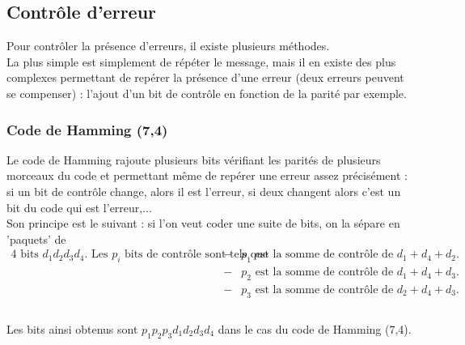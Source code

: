 \documentclass[a4paper,10pt]{book}
\begin{document}
\subsection{Contrôle d'erreur}
Pour contrôler la présence d'erreurs, il existe plusieurs méthodes.\\

La plus simple est simplement de répéter le message, mais il en existe des plus complexes permettant de repérer la présence d'une erreur (deux erreurs peuvent se compenser) : l'ajout d'un bit de contrôle en fonction de la parité par exemple.\\

\subsubsection{Code de Hamming (7,4)}
Le code de Hamming rajoute plusieurs bits vérifiant les parités de plusieurs morceaux du code et permettant même de repérer une erreur assez précisément : si un bit de contrôle change, alors il est l'erreur, si deux changent alors c'est un bit du code qui est l'erreur,...\\

Son principe est le suivant : si l'on veut coder une suite de bits, on la sépare en 'paquets' de
$\begin{array}{rcl}\text{4 bits }d_{1}d_{2}d_{3}d_{4}. \text{ Les }p_{i}\text{ bits de contrôle sont tels que }&-&p_{1}\text{ est la somme de contrôle de }d_{1}+d_{4}+d_{2}.\\
&-& p_{2}\text{ est la somme de contrôle de }d_{1}+d_{4}+d_{3}.\\
&-&p_{3}\text{ est la somme de contrôle de }d_{2}+d_{4}+d_{3}.\\\\ \end{array}$

Les bits ainsi obtenus sont $p_{1}p_{2}p_{3}d_{1}d_{2}d_{3}d_{4}$ dans le cas du code de Hamming (7,4).
\end{document}

